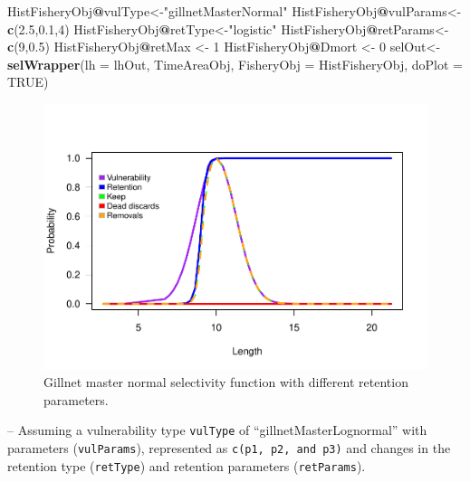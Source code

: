\documentclass[
]{book}
\newenvironment{Shaded}{\begin{snugshade}}{\end{snugshade}}
\newcommand{\AttributeTok}[1]{\textcolor[rgb]{0.13,0.29,0.53}{#1}}
\newcommand{\ConstantTok}[1]{\textcolor[rgb]{0.56,0.35,0.01}{#1}}
\newcommand{\DecValTok}[1]{\textcolor[rgb]{0.00,0.00,0.81}{#1}}
\newcommand{\FloatTok}[1]{\textcolor[rgb]{0.00,0.00,0.81}{#1}}
\newcommand{\FunctionTok}[1]{\textcolor[rgb]{0.13,0.29,0.53}{\textbf{#1}}}
\newcommand{\NormalTok}[1]{#1}
\newcommand{\OtherTok}[1]{\textcolor[rgb]{0.56,0.35,0.01}{#1}}
\newcommand{\SpecialCharTok}[1]{\textcolor[rgb]{0.81,0.36,0.00}{\textbf{#1}}}
\newcommand{\StringTok}[1]{\textcolor[rgb]{0.31,0.60,0.02}{#1}}
\begin{document}
\begin{Shaded}
\begin{Highlighting}[]
\NormalTok{HistFisheryObj}\SpecialCharTok{@}\NormalTok{vulType}\OtherTok{\textless{}{-}}\StringTok{"gillnetMasterNormal"}
\NormalTok{HistFisheryObj}\SpecialCharTok{@}\NormalTok{vulParams}\OtherTok{\textless{}{-}}\FunctionTok{c}\NormalTok{(}\FloatTok{2.5}\NormalTok{,}\FloatTok{0.1}\NormalTok{,}\DecValTok{4}\NormalTok{)}
\NormalTok{HistFisheryObj}\SpecialCharTok{@}\NormalTok{retType}\OtherTok{\textless{}{-}}\StringTok{"logistic"}
\NormalTok{HistFisheryObj}\SpecialCharTok{@}\NormalTok{retParams}\OtherTok{\textless{}{-}}\FunctionTok{c}\NormalTok{(}\DecValTok{9}\NormalTok{,}\FloatTok{0.5}\NormalTok{)}
\NormalTok{HistFisheryObj}\SpecialCharTok{@}\NormalTok{retMax }\OtherTok{\textless{}{-}} \DecValTok{1}
\NormalTok{HistFisheryObj}\SpecialCharTok{@}\NormalTok{Dmort }\OtherTok{\textless{}{-}} \DecValTok{0}
\NormalTok{selOut}\OtherTok{\textless{}{-}}\FunctionTok{selWrapper}\NormalTok{(}\AttributeTok{lh =}\NormalTok{ lhOut, TimeAreaObj, }\AttributeTok{FisheryObj =}\NormalTok{ HistFisheryObj, }\AttributeTok{doPlot =} \ConstantTok{TRUE}\NormalTok{)}
\end{Highlighting}
\end{Shaded}

\begin{figure}
\centering
\includegraphics{_main_files/figure-latex/sel4-1.pdf}
\caption{\label{fig:sel4}Gillnet master normal selectivity function with different retention parameters.}
\end{figure}

-- Assuming a vulnerability type \texttt{vulType} of ``gillnetMasterLognormal'' with parameters (\texttt{vulParams}), represented as \texttt{c(p1,\ p2,\ and\ p3)} and changes in the retention type (\texttt{retType}) and retention parameters (\texttt{retParams}).
\end{document}
